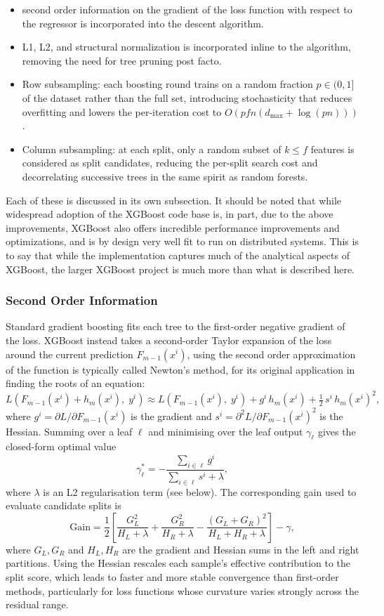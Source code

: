 \documentclass[a4paper, 11pt]{article}
\begin{document}
\begin{itemize}
  \item second order information on the gradient of the loss function
    with respect to the regressor is incorporated into the descent algorithm.
  \item L1, L2, and structural normalization is incorporated inline
    to the algorithm, removing the need for tree pruning post facto.
  \item Row subsampling: each boosting round trains on a random
    fraction $p \in (0,1]$ of the dataset rather than the full set,
    introducing stochasticity that reduces overfitting and lowers the
    per-iteration cost to $O(pfn(d_{\max} + \log(pn)))$.
  \item Column subsampling: at each split, only a random subset of
    $k \leq f$ features is considered as split candidates, reducing
    the per-split search cost and decorrelating successive trees in
    the same spirit as random forests.
\end{itemize}

Each of these is discussed in its own subsection. It should be noted
that while widespread adoption of the XGBoost code base is, in part, due
to the above improvements, XGBoost also offers incredible performance
improvements and optimizations, and is by design very well fit to run
on distributed systems. This is to say that while the implementation
captures much of the analytical aspects of XGBoost, the larger
XGBoost project is much more than what is described here.

\subsubsection{Second Order Information}

Standard gradient boosting fits each tree to the first-order negative
gradient of the loss. XGBoost instead takes a
second-order Taylor expansion of the loss around the current
prediction $F_{m-1}(x^i)$, using the second order approximation of
the function is typically called Newton's method, for its original
application in finding the roots of an equation:
\[
  L\!\left(F_{m-1}(x^i) + h_m(x^i),\; y^i\right)
  \approx L\!\left(F_{m-1}(x^i),\; y^i\right)
  + g^i\, h_m(x^i)
  + \tfrac{1}{2}\, s^i\, h_m(x^i)^2,
\]
where $g^i = \partial L / \partial F_{m-1}(x^i)$ is the gradient and
$s^i = \partial^2 L / \partial F_{m-1}(x^i)^2$ is the Hessian.
Summing over a leaf $\ell$ and minimising over the leaf output
$\gamma_\ell$ gives the closed-form optimal value
\[
  \gamma_\ell^* = -\frac{\sum_{i \in \ell} g^i}{\sum_{i \in \ell} s^i
  + \lambda},
\]
where $\lambda$ is an L2 regularisation term (see below). The
corresponding gain used to evaluate candidate splits is
\[
  \mathrm{Gain} = \frac{1}{2}\left[
    \frac{G_L^2}{H_L + \lambda}
    + \frac{G_R^2}{H_R + \lambda}
    - \frac{(G_L+G_R)^2}{H_L+H_R+\lambda}
  \right] - \gamma,
\]
where $G_L, G_R$ and $H_L, H_R$ are the gradient and Hessian sums
in the left and right partitions. Using the Hessian rescales each
sample's effective contribution to the split score, which leads to
faster and more stable convergence than first-order methods,
particularly for loss functions whose curvature varies strongly
across the residual range.
\end{document}
